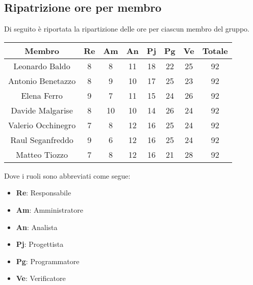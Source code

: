 \documentclass[italian,12pt]{article} %
\begin{document}
\newpage
\subsection{Ripatrizione ore per membro}
Di seguito è riportata la ripartizione delle ore per ciascun membro del gruppo.

\begin{table}[!h]
	\begin{center}
		\begin{tabular}{ |c|c|c|c|c|c|c|c| }
			\hline
			\textbf{Membro}    & \textbf{Re} & \textbf{Am} & \textbf{An} & \textbf{Pj} & \textbf{Pg} & \textbf{Ve} & \textbf{Totale} \\
			\hline
			Leonardo Baldo     & 8           & 8           & 11          & 18          & 22          & 25          & 92              \\
			Antonio Benetazzo  & 8           & 9           & 10          & 17          & 25          & 23          & 92              \\
			Elena Ferro        & 9           & 7           & 11          & 15          & 24          & 26          & 92              \\
			Davide Malgarise   & 8           & 10          & 10          & 14          & 26          & 24          & 92              \\
			Valerio Occhinegro & 7           & 8           & 12          & 16          & 25          & 24          & 92              \\
			Raul Seganfreddo   & 9           & 6           & 12          & 16          & 25          & 24          & 92              \\
			Matteo Tiozzo      & 7           & 8           & 12          & 16          & 21          & 28          & 92              \\
			\hline
		\end{tabular}
	\end{center}
\end{table}

Dove i ruoli sono abbreviati come segue:
\begin{itemize}
	\item \textbf{Re}: Responsabile
	\item \textbf{Am}: Amministratore
	\item \textbf{An}: Analista
	\item \textbf{Pj}: Progettista
	\item \textbf{Pg}: Programmatore
	\item \textbf{Ve}: Verificatore
\end{itemize}
\end{document}
